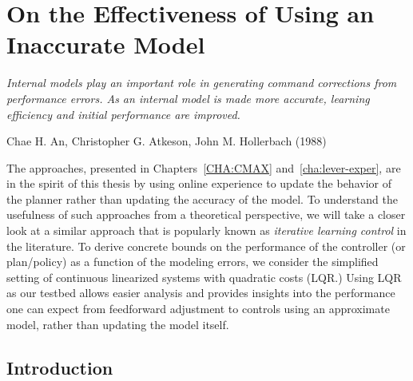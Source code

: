 \chapter{On the Effectiveness of Using an Inaccurate Model}
\label{cha:ilc}

\epigraph{\textit{Internal models play an important role in generating
    command corrections from performance errors. As an internal model
    is made more accurate, learning efficiency and initial performance
    are improved.}}{Chae H. An, Christopher G. Atkeson, John
  M. Hollerbach (1988)}

The approaches, presented in Chapters~\ref{CHA:CMAX}
and~\ref{cha:lever-exper}, are 
in the spirit of this thesis by using online experience to update the
behavior of the planner rather than updating the accuracy of the
model. To understand the usefulness of such approaches from a
theoretical perspective, we will take a closer look at a similar
approach that is popularly known as \textit{iterative learning
  control} in the literature. To derive concrete bounds on the
performance of the controller (or plan/policy) as a function of the
modeling errors, we consider the simplified setting of continuous
linearized systems with quadratic costs (LQR.) Using LQR as our
testbed allows easier analysis and provides insights into the
performance one can expect from feedforward adjustment to controls
using an approximate model, rather than updating the model itself.

\section{Introduction}
\label{sec:intro}

